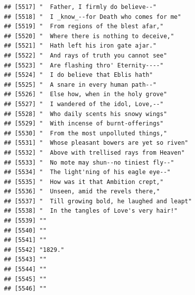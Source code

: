 \documentclass{article}\usepackage[]{graphicx}\usepackage[]{color}
\makeatletter
\newenvironment{kframe}{%
 \def\at@end@of@kframe{}%
 \ifinner\ifhmode%
  \def\at@end@of@kframe{\end{minipage}}%
  \begin{minipage}{\columnwidth}%
 \fi\fi%
 \def\FrameCommand##1{\hskip\@totalleftmargin \hskip-\fboxsep
 \colorbox{shadecolor}{##1}\hskip-\fboxsep
     \hskip-\linewidth \hskip-\@totalleftmargin \hskip\columnwidth}%
 \MakeFramed {\advance\hsize-\width
   \@totalleftmargin\z@ \linewidth\hsize
   \@setminipage}}%
 {\par\unskip\endMakeFramed%
 \at@end@of@kframe}
\newenvironment{knitrout}{}{} %
\makeatother
\begin{document}
\begin{knitrout}
\begin{kframe}
\begin{verbatim}
## [5517] "  Father, I firmly do believe--"                                             
## [5518] "  I _know_--for Death who comes for me"                                      
## [5519] "  From regions of the blest afar,"                                           
## [5520] "  Where there is nothing to deceive,"                                        
## [5521] "  Hath left his iron gate ajar."                                             
## [5522] "  And rays of truth you cannot see"                                          
## [5523] "  Are flashing thro' Eternity----"                                           
## [5524] "  I do believe that Eblis hath"                                              
## [5525] "  A snare in every human path--"                                             
## [5526] "  Else how, when in the holy grove"                                          
## [5527] "  I wandered of the idol, Love,--"                                           
## [5528] "  Who daily scents his snowy wings"                                          
## [5529] "  With incense of burnt-offerings"                                           
## [5530] "  From the most unpolluted things,"                                          
## [5531] "  Whose pleasant bowers are yet so riven"                                    
## [5532] "  Above with trellised rays from Heaven"                                     
## [5533] "  No mote may shun--no tiniest fly--"                                        
## [5534] "  The light'ning of his eagle eye--"                                         
## [5535] "  How was it that Ambition crept,"                                           
## [5536] "  Unseen, amid the revels there,"                                            
## [5537] "  Till growing bold, he laughed and leapt"                                   
## [5538] "  In the tangles of Love's very hair!"                                       
## [5539] ""                                                                            
## [5540] ""                                                                            
## [5541] ""                                                                            
## [5542] "1829."                                                                       
## [5543] ""                                                                            
## [5544] ""                                                                            
## [5545] ""                                                                            
## [5546] ""                                                                            

\end{verbatim}
\end{kframe}
\end{knitrout}
\end{document}
